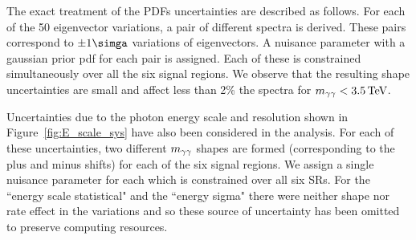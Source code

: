 

The exact treatment of the PDFs uncertainties are described as follows. For each of the 50 eigenvector variations, a pair of different \mgg spectra is derived. These pairs correspond to $\pm1\simga$ variations of eigenvectors. A nuisance parameter with a gaussian prior pdf for each pair is assigned. Each of these is constrained simultaneously over all the six signal regions. We observe that the resulting shape uncertainties are small and affect less than 2\% the spectra for $m_{\gamma\gamma}<3.5\,\text{Te\hspace{-.08em}V}$.

Uncertainties due to the photon energy scale and resolution shown in Figure~\ref{fig:E_scale_sys} have also been considered in the analysis. For each of these uncertainties, two different $m_{\gamma\gamma}$  shapes are formed (corresponding to the plus and minus shifts) for each of the six signal regions. We assign a single nuisance parameter for each which is constrained over all six SRs. For the ``energy scale statistical" and the ``energy sigma" there were neither shape nor rate effect in the variations and so these source of uncertainty has been omitted to preserve computing resources.


